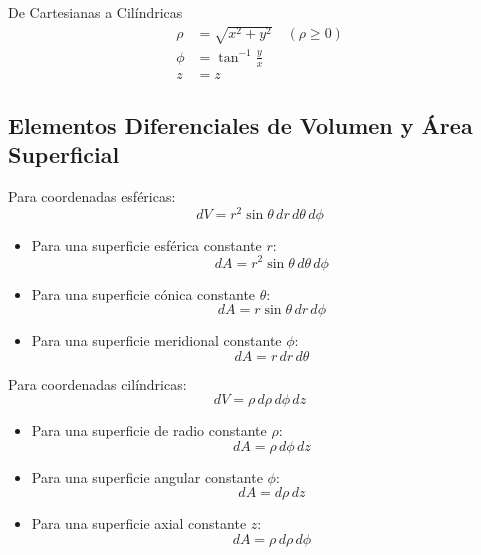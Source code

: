 \documentclass[12pt,a4paper,twocolumn]{article}
\begin{document}
De Cartesianas a Cilíndricas
\begin{align*}
    \rho & = \sqrt{x^2 + y^2} \quad (\rho \geq 0) \\
    \phi & = \tan^{-1} \frac{y}{x}                \\
    z    & = z
\end{align*}

\subsection*{Elementos Diferenciales de Volumen y Área Superficial}

Para coordenadas esféricas:
\begin{equation*}
    dV = r^2 \sin \theta \, dr \, d\theta \, d\phi
\end{equation*}

\begin{itemize}
    \item Para una superficie esférica constante $r$:
          \begin{equation*}
              dA = r^2 \sin \theta \, d\theta \, d\phi
          \end{equation*}
    \item Para una superficie cónica constante $\theta$:
          \begin{equation*}
              dA = r \sin \theta \, dr \, d\phi
          \end{equation*}
    \item Para una superficie meridional constante $\phi$:
          \begin{equation*}
              dA = r \, dr \, d\theta
          \end{equation*}
\end{itemize}

Para coordenadas cilíndricas:
\begin{equation*}
    dV = \rho \, d\rho \, d\phi \, dz
\end{equation*}

\begin{itemize}
    \item Para una superficie de radio constante $\rho$:
          \begin{equation*}
              dA = \rho \, d\phi \, dz
          \end{equation*}
    \item Para una superficie angular constante $\phi$:
          \begin{equation*}
              dA = d\rho \, dz
          \end{equation*}
    \item Para una superficie axial constante $z$:
          \begin{equation*}
              dA = \rho \, d\rho \, d\phi
          \end{equation*}
\end{itemize}
\end{document}
